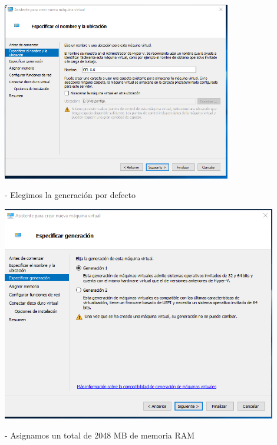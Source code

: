 \documentclass[12pt,letterpaper]{article}
\begin{document}
\begin{center}
	\includegraphics[width=10cm]{./Imagenes/7} 
\end{center}



\begin{itemize}
- Elegimos la generación por defecto\\
\end{itemize}

\begin{center}
	\includegraphics[width=12cm]{./Imagenes/8} 
\end{center}



\begin{itemize}
- Asignamos un total de 2048 MB de memoria RAM\\
\end{itemize}
\end{document}
